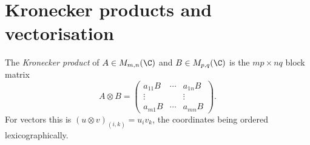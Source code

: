 \section{Kronecker products and vectorisation}

\begin{definition}\label{linear:def:kronecker}
The \emph{Kronecker product} of $A\in M_{m,n}(\C)$ and $B\in M_{p,q}(\C)$ is the $mp\times nq$ block matrix
\[
A\otimes B=\begin{pmatrix}a_{11}B&\cdots&a_{1n}B\\\vdots&&\vdots\\a_{m1}B&\cdots&a_{mn}B\end{pmatrix}.
\]
For vectors this is $(u\otimes v)_{(i,k)}=u_iv_k$, the coordinates being ordered lexicographically.
\end{definition}


